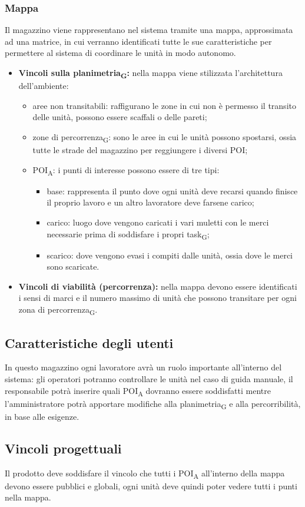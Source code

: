 \subsubsection{Mappa}
Il magazzino viene rappresentano nel sistema tramite una mappa, approssimata ad una matrice, in cui verranno identificati tutte le sue caratteristiche per permettere al sistema di coordinare le unità in modo autonomo.
\begin{itemize}
	\item \textbf{Vincoli sulla \gls{planimetria}\textsubscript{G}:} nella mappa viene stilizzata l'architettura dell'ambiente:
	\begin{itemize}
		\item aree non transitabili: raffigurano le zone in cui non è permesso il transito delle unità, possono essere scaffali o delle pareti;
		\item zone di \gls{percorrenza}\textsubscript{G}: sono le aree in cui le unità possono spostarsi, ossia tutte le strade del magazzino per reggiungere i diversi POI;
		\item \acrshort{POI}\textsubscript{A}: i punti di interesse possono essere di tre tipi:
		\begin{itemize}
			\item base: rappresenta il punto dove ogni unità deve recarsi quando finisce il proprio lavoro e un altro lavoratore deve farsene carico;
			\item carico: luogo dove vengono caricati i vari muletti con le merci necessarie prima di soddisfare i propri \gls{task}\textsubscript{G};
			\item scarico: dove vengono evasi i compiti dalle unità, ossia dove le merci sono scaricate.
		\end{itemize}
	\end{itemize}
	\item \textbf{Vincoli di viabilità (percorrenza):} nella mappa devono essere identificati i sensi di marci e il numero massimo di unità che possono transitare per ogni zona di \gls{percorrenza}\textsubscript{G}.
	
\end{itemize}

\subsection{Caratteristiche degli utenti}
In questo magazzino ogni lavoratore avrà un ruolo importante all'interno del sistema: gli operatori potranno controllare le unità nel caso di guida manuale, il responsabile potrà inserire quali \acrshort{POI}\textsubscript{A} dovranno essere soddisfatti mentre l'amministratore potrà apportare modifiche alla \gls{planimetria}\textsubscript{G} e alla percorribilità, in base alle esigenze.
\subsection{Vincoli progettuali}
Il prodotto deve soddisfare il vincolo che tutti i \acrshort{POI}\textsubscript{A} all'interno della mappa devono essere pubblici e globali, ogni unità deve quindi poter vedere tutti i punti nella mappa.